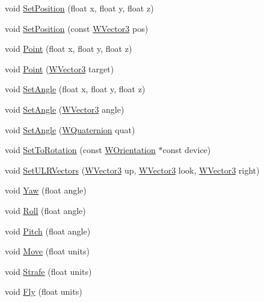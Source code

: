 \begin{DoxyCompactItemize}
\item 
void \hyperlink{class_w_orientation_a3a68aa49d184514b0dbe6771de72e6d1}{Set\+Position} (float x, float y, float z)
\item 
void \hyperlink{class_w_orientation_a39989d6816e328259d2937fc0506b7bd}{Set\+Position} (const \hyperlink{class_w_vector3}{W\+Vector3} pos)
\item 
void \hyperlink{class_w_orientation_a0c0a0b7237d4d30f3385aa98f1a8ffae}{Point} (float x, float y, float z)
\item 
void \hyperlink{class_w_orientation_a1eff9c421a793b32e2e861fa946e2b31}{Point} (\hyperlink{class_w_vector3}{W\+Vector3} target)
\item 
void \hyperlink{class_w_orientation_a7fdd3e9e05c7a248524a085369aaf91c}{Set\+Angle} (float x, float y, float z)
\item 
void \hyperlink{class_w_orientation_a6b0d871c5f43b449cfde84471b5d7767}{Set\+Angle} (\hyperlink{class_w_vector3}{W\+Vector3} angle)
\item 
void \hyperlink{class_w_orientation_a60a647b2aa8e1eed0046ae40f9f3bbdf}{Set\+Angle} (\hyperlink{group__engineclass_ga717cc687f6844e7a4a2de4948b96c6ef}{W\+Quaternion} quat)
\item 
void \hyperlink{class_w_orientation_a5c6b86367863894a8f1d8bf0f81984ab}{Set\+To\+Rotation} (const \hyperlink{class_w_orientation}{W\+Orientation} $\ast$const device)
\item 
void \hyperlink{class_w_orientation_a35b078ed1a5da4500552eab4b6f249f0}{Set\+U\+L\+R\+Vectors} (\hyperlink{class_w_vector3}{W\+Vector3} up, \hyperlink{class_w_vector3}{W\+Vector3} look, \hyperlink{class_w_vector3}{W\+Vector3} right)
\item 
void \hyperlink{class_w_orientation_a12b970c9255a7d36db7c0d33110dfb86}{Yaw} (float angle)
\item 
void \hyperlink{class_w_orientation_a3590a1fec64b4d2e705652be84ad92a3}{Roll} (float angle)
\item 
void \hyperlink{class_w_orientation_ad8ec4b178ba429d2a3b3a26818992007}{Pitch} (float angle)
\item 
void \hyperlink{class_w_orientation_ac56b6bfeaea177b1b0a8a3db56c2c1c2}{Move} (float units)
\item 
void \hyperlink{class_w_orientation_a052cf06c287c50c4c155edf1a76ca44f}{Strafe} (float units)
\item 
void \hyperlink{class_w_orientation_a4837da349ca24d978d3a8c1545a5f25a}{Fly} (float units)

\end{DoxyCompactItemize}
